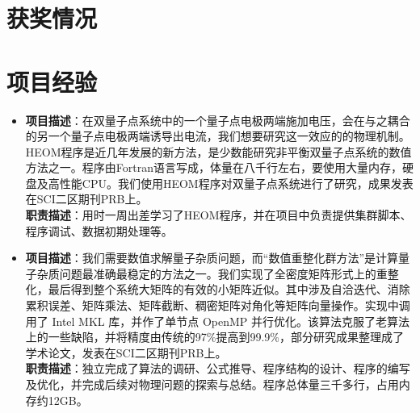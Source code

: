 \documentclass{resume}
\begin{document}
\section{获奖情况}

\section{项目经验}
\begin{itemize}%


\item  {}
\textbf{项目描述}：在双量子点系统中的一个量子点电极两端施加电压，会在与之耦合的另一个量子点电极两端诱导出电流，我们想要研究这一效应的的物理机制。HEOM程序是近几年发展的新方法，是少数能研究非平衡双量子点系统的数值方法之一。程序由Fortran语言写成，体量在八千行左右，要使用大量内存，硬盘及高性能CPU。我们使用HEOM程序对双量子点系统进行了研究，成果发表在SCI二区期刊PRB上。\\
\textbf{职责描述}：用时一周出差学习了HEOM程序，并在项目中负责提供集群脚本、程序调试、数据初期处理等。

\item {}
{\textbf{项目描述}：我们需要数值求解量子杂质问题，而“数值重整化群方法”是计算量子杂质问题最准确最稳定的方法之一。我们实现了全密度矩阵形式上的重整化，最后得到整个系统大矩阵的有效的小矩阵近似。其中涉及自洽迭代、消除累积误差、矩阵乘法、矩阵截断、稠密矩阵对⻆化等矩阵向量操作。实现中调用了 Intel MKL 库，并作了单节点 OpenMP 并行优化。该算法克服了老算法上的一些缺陷，并将精度由传统的97\%提高到99.9\%，部分研究成果整理成了学术论文，发表在SCI二区期刊PRB上。}\\
\textbf{职责描述}：独立完成了算法的调研、公式推导、程序结构的设计、程序的编写及优化，并完成后续对物理问题的探索与总结。程序总体量三千多行，占用内存约12GB。


\end{itemize}
\end{document}
